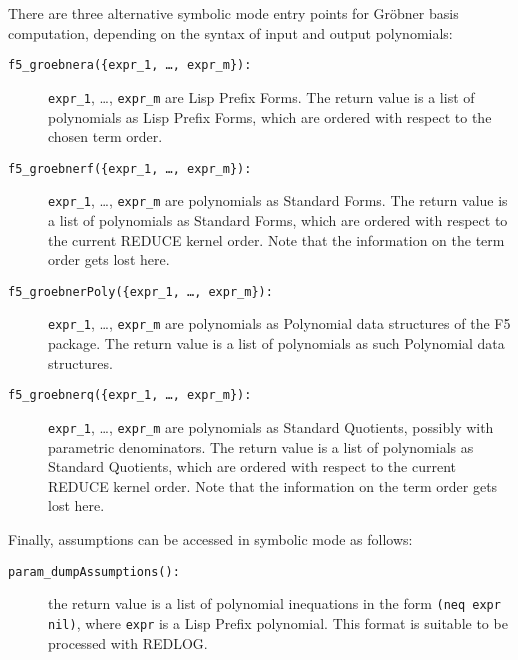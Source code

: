 \documentclass{article}
\newcommand{\grobner}{Gr\"obner}
\newcommand{\code}[1]{\texttt{#1}}
\begin{document}
There are three alternative symbolic mode entry points for \grobner{} basis computation, depending
on the syntax of input and output polynomials:
\begin{description}
\item[\code{f5\_groebnera(\{expr\_1, \ldots, expr\_m\}):}] \code{expr\_1}, \dots, \code{expr\_m} are
Lisp Prefix Forms. The return value is a list of polynomials as Lisp Prefix Forms, which are ordered
with respect to the chosen term order.
%
\item[\code{f5\_groebnerf(\{expr\_1, \ldots, expr\_m\}):}] \code{expr\_1}, \dots, \code{expr\_m} are
polynomials as Standard Forms. The return value is a list of polynomials as Standard Forms, which
are ordered with respect to the current REDUCE kernel order. Note that the information on the term
order gets lost here.
%
\item[\code{f5\_groebnerPoly(\{expr\_1, \ldots, expr\_m\}):}] \code{expr\_1}, \dots, \code{expr\_m}
are polynomials as Polynomial data structures of the F5 package. The return value is a list of
polynomials as such Polynomial data structures.
%
\item[\code{f5\_groebnerq(\{expr\_1, \ldots, expr\_m\}):}] \code{expr\_1}, \dots, \code{expr\_m} are
polynomials as Standard Quotients, possibly with parametric denominators. The return value is a list
of polynomials as Standard Quotients, which are ordered with respect to the current REDUCE kernel
order. Note that the information on the term order gets lost here.
\end{description}

Finally, assumptions can be accessed in symbolic mode as follows:
\begin{description}
\item[\code{param\_dumpAssumptions():}] the return value is a list of polynomial inequations in the
form \code{(neq expr nil)}, where \code{expr} is a Lisp Prefix polynomial. This format is suitable
to be processed with REDLOG.
\end{description}



\end{document}
